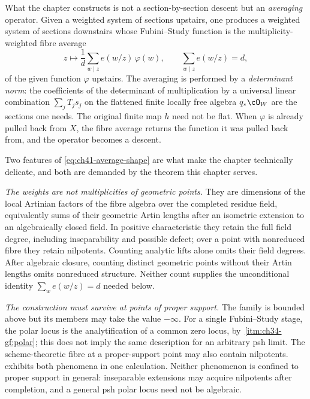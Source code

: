 What the chapter constructs is not a section-by-section descent but an
\emph{averaging} operator.  Given a weighted system of sections upstairs,
one produces a weighted system of sections downstairs whose Fubini--Study
function is the multiplicity-weighted fibre average
\[
 z\longmapsto\frac1d\sum_{w\mid z}e(w/z)\,\varphi(w),
 \qquad
 \sum_{w\mid z}e(w/z)=d,
\tag{41.1}\label{eq:ch41-average-shape}
\]
of the given function $\varphi$ upstairs.  The averaging is performed by a
\emph{determinant norm}: the coefficients of the determinant of
multiplication by a universal linear combination $\sum_jT_js_j$ on the
flattened finite locally free algebra $q_*\cO_W$ are the sections one needs.
The original finite map $h$ need not be flat.  When $\varphi$ is
already pulled back from $X$, the fibre average returns the function it
was pulled back from, and the operator becomes a descent.

Two features of \eqref{eq:ch41-average-shape} are what make the chapter
technically delicate, and both are demanded by the theorem this chapter
serves.

\emph{The weights are not multiplicities of geometric points.}  They are
dimensions of the local Artinian factors of the fibre algebra over the
completed residue field, equivalently sums of their geometric Artin lengths
after an isometric extension to an algebraically closed field.  In positive
characteristic they retain the full field degree, including inseparability
and possible defect; over a point with nonreduced fibre they retain
nilpotents.  Counting analytic lifts alone omits their field degrees.
After algebraic closure, counting distinct geometric points without their
Artin lengths omits nonreduced structure.  Neither count supplies the
unconditional identity $\sum_we(w/z)=d$ needed below.

\emph{The construction must survive at points of proper support.}  The
family is bounded above but its members may take the value $-\infty$.
For a single Fubini--Study stage, the polar locus is the analytification
of a common zero locus, by
\,\cref{itm:ch34-gf:polar};
this does not imply the same description for an arbitrary psh limit.
The scheme-theoretic fibre at a proper-support point may also contain
nilpotents.   exhibits both phenomena in
one calculation.  Neither phenomenon is confined to proper support in
general: inseparable extensions may acquire nilpotents after completion,
and a general psh polar locus need not be algebraic.

